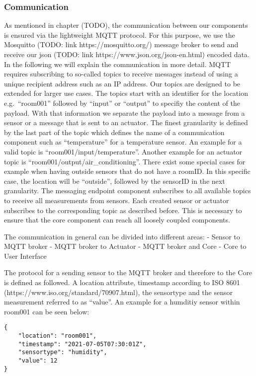 \subsubsection{Communication}\label{communication}

As mentioned in chapter (TODO), the communication between our components
is ensured via the lightweight MQTT protocol. For this purpose, we use
the Mosquitto (TODO: link https://mosquitto.org/) message broker to send
and receive our json (TODO: link https://www.json.org/json-en.html)
encoded data. In the following we will explain the communication in more
detail. MQTT requires subscribing to so-called topics to receive
messages instead of using a unique recipient address such as an IP
address. Our topics are designed to be extended for larger use cases.
The topics start with an identifier for the location e.g.~``room001''
followed by ``input'' or ``output'' to specifiy the content of the
payload. With that information we separate the payload into a message
from a sensor or a message that is sent to an actuator. The finest
granularity is defined by the last part of the topic which defines the
name of a communication component such as ``temperature'' for a
temperature sensor. An example for a valid topic is
``room001/input/temperature''. Another example for an actuator topic is
``room001/output/air\_conditioning''. There exist some special cases for
example when having outside sensors that do not have a roomID. In this
specific case, the location will be ``outside'', followed by the
sensorID in the next granularity. The messaging endpoint component
subscribes to all available topics to receive all measurements from
sensors. Each created sensor or actuator subscribes to the corresponding
topic as described before. This is necessary to ensure that the core
component can reach all loosely coupled components.

The communication in general can be divided into different areas: -
Sensor to MQTT broker - MQTT broker to Actuator - MQTT broker and Core -
Core to User Interface

The protocol for a sending sensor to the MQTT broker and therefore to
the Core is defined as followed. A location attribute, timestamp
according to ISO 8601 (https://www.iso.org/standard/70907.html), the
sensortype and the sensor measurement referred to as ``value''. An
example for a humditiy sensor within room001 can be seen below:

\begin{verbatim}
{
    "location": "room001",
    "timestamp": "2021-07-05T07:30:01Z",
    "sensortype": "humidity",
    "value": 12
}
\end{verbatim}

